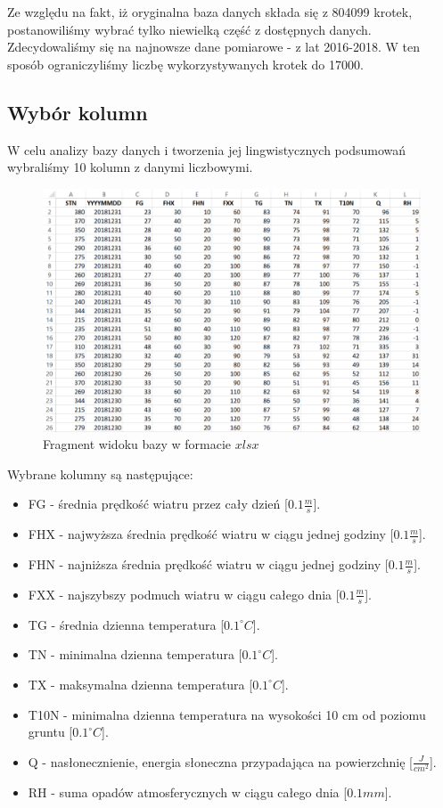 \documentclass{classrep}
\begin{document}
Ze względu na fakt, iż oryginalna baza danych składa się z 804099 krotek, postanowiliśmy wybrać tylko niewielką część z dostępnych danych. Zdecydowaliśmy się na najnowsze dane pomiarowe - z lat 2016-2018. W ten sposób ograniczyliśmy liczbę wykorzystywanych krotek do 17000.\newline

\subsection{Wybór kolumn}
W celu analizy bazy danych i tworzenia jej lingwistycznych podsumowań wybraliśmy 10 kolumn z danymi liczbowymi.

\begin{figure}[H]
	\centering
	\includegraphics[width=\textwidth]{Pictures/baza.png}
	\caption{Fragment widoku bazy w formacie $xlsx$}
\end{figure}

Wybrane kolumny są następujące:
\begin{itemize}[label=$\bullet$\scshape\bfseries]
\item FG - średnia prędkość wiatru przez cały dzień [$0.1 \frac{m}{s}$].
\item FHX - najwyższa średnia prędkość wiatru w ciągu jednej godziny [$0.1 \frac{m}{s}$].
\item FHN - najniższa średnia prędkość wiatru w ciągu jednej godziny [$0.1 \frac{m}{s}$].
\item FXX - najszybszy podmuch wiatru w ciągu całego dnia [$0.1 \frac{m}{s}$].
\item TG - średnia dzienna temperatura [$0.1^{\circ} C$].
\item TN - minimalna dzienna temperatura [$0.1^{\circ} C$].
\item TX - maksymalna dzienna temperatura [$0.1^{\circ} C$].
\item T10N - minimalna dzienna temperatura na wysokości 10 cm od poziomu gruntu [$0.1^{\circ} C$].
\item Q - nasłonecznienie, energia słoneczna przypadająca na powierzchnię [$\frac{J}{cm^2}$].
\item RH - suma opadów atmosferycznych w ciągu całego dnia [$0.1 mm$].\newline
\end{itemize}
\end{document}
